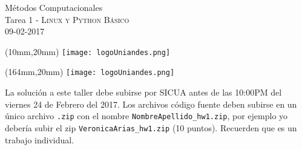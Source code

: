 \documentclass[11pt,letterpaper]{exam}
\begin{document}
\begin{center}
{\Large Métodos Computacionales} \\
Tarea 1 - \textsc{Linux y Python Básico}\\
09-02-2017\\
\end{center}

\begin{textblock*}{40mm}(10mm,20mm)
  \texttt{[image: logoUniandes.png]}
\end{textblock*}

\begin{textblock*}{40mm}(164mm,20mm)
  \texttt{[image: logoUniandes.png]}
\end{textblock*}

\vspace{0.3cm}

\noindent
La solución a este taller debe subirse por SICUA antes de las 10:00PM
del viernes 24 de Febrero del 2017. 
\noindent
Los archivos c\'odigo fuente deben subirse en un \'unico archivo
\verb".zip" con el nombre \verb"NombreApellido_hw1.zip", por ejemplo
yo deber\'ia subir el zip \verb"VeronicaArias_hw1.zip" (10 puntos). Recuerden que es un trabajo individual.

\vspace{0.3cm}
\end{document}

